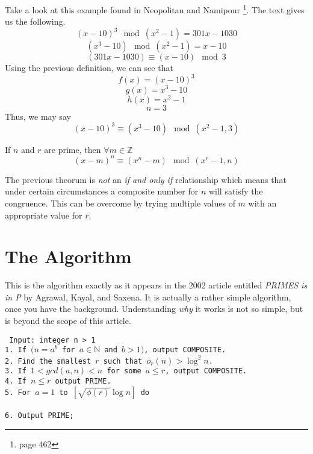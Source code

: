 \documentclass[11pt]{article}
\begin{document}
Take a look at this example found in Neopolitan and Namipour \footnote{page 462}. The text gives us the following.
$$(x-10)^3 \mod (x^2-1) = 301x-1030 $$
$$(x^3-10) \mod (x^2-1) = x-10$$
$$(301x-1030) \equiv (x-10) \mod 3$$
Using the previous definition, we can see that
$$f(x) = (x-10)^3$$
$$g(x) = x^3-10$$
$$h(x) = x^2-1$$
$$n=3$$
Thus, we may say
$$(x-10)^3 \equiv (x^3-10) \mod (x^2-1,3)$$
\begin{thm}{If $n$ and $r$ are prime, then $\forall{m\in{\mathbb{Z}}}$}
\begin{equation}
(x-m)^n \equiv (x^n -m) \mod (x^r-1,n)
\end{equation}
\end{thm}
The previous theorum is \emph{not} an \emph{if and only if} relationship which means that under certain circumstances a composite number for $n$ will satisfy the congruence. This can be overcome by trying multiple values of $m$ with an appropriate value for $r$.

\section{The Algorithm}
This is the algorithm exactly as it appears in the 2002 article entitled \emph{PRIMES is in P} by Agrawal, Kayal, and Saxena. It is actually a rather simple algorithm, once you have the background. Understanding \emph{why} it works is not so simple, but is beyond the scope of this article. \vspace{2pc}

\texttt{
Input: integer n > 1 \\
1. If $(n=a^b$ for $a\in{\mathbb{N}}$ and  $b>1)$, output COMPOSITE. \\
2. Find the smallest $r$ such that 	$o_r(n)>\log^2n$. \\
3. If $1<gcd(a,n)<n$ for some $a\le{r}$, output COMPOSITE. \\
4. If $n \le{r}$ output PRIME. \\
5. For $a=1$ to $[\sqrt{\phi(r)}\log{n}]$ do \\
 \\
6. Output PRIME; \\
}
\end{document}
